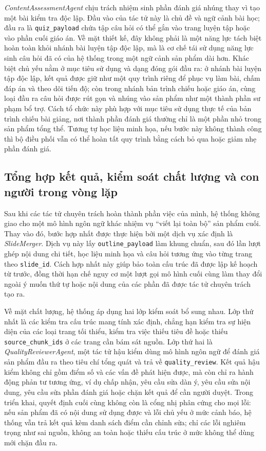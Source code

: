 \documentclass[../DoAn.tex]{subfiles}
\begin{document}
\textit{ContentAssessmentAgent} chịu trách nhiệm sinh phần đánh giá nhúng thay vì tạo một bài kiểm tra độc lập. Đầu vào của tác tử này là chủ đề và ngữ cảnh bài học; đầu ra là \texttt{quiz\_payload} chứa tập câu hỏi có thể gắn vào trang luyện tập hoặc vào phần cuối giáo án. Về mặt thiết kế, đây không phải là một năng lực tách biệt hoàn toàn khỏi nhánh bài luyện tập độc lập, mà là cơ chế tái sử dụng năng lực sinh câu hỏi đã có của hệ thống trong một ngữ cảnh sản phẩm dài hơn. Khác biệt chủ yếu nằm ở mục tiêu sử dụng và dạng đóng gói đầu ra: ở nhánh bài luyện tập độc lập, kết quả được giữ như một quy trình riêng để phục vụ làm bài, chấm đáp án và theo dõi tiến độ; còn trong nhánh bản trình chiếu hoặc giáo án, cùng loại đầu ra câu hỏi được rút gọn và nhúng vào sản phẩm như một thành phần sư phạm bổ trợ. Cách tổ chức này phù hợp với mục tiêu sử dụng thực tế của bản trình chiếu bài giảng, nơi thành phần đánh giá thường chỉ là một phần nhỏ trong sản phẩm tổng thể. Tương tự học liệu minh họa, nếu bước này không thành công thì bộ điều phối vẫn có thể hoàn tất quy trình bằng cách bỏ qua hoặc giảm nhẹ phần đánh giá.

\subsection{Tổng hợp kết quả, kiểm soát chất lượng và con người trong vòng lặp}

Sau khi các tác tử chuyên trách hoàn thành phần việc của mình, hệ thống không giao cho một mô hình ngôn ngữ khác nhiệm vụ ``viết lại toàn bộ'' sản phẩm cuối. Thay vào đó, bước hợp nhất được thực hiện bởi một dịch vụ xác định là \textit{SlideMerger}. Dịch vụ này lấy \texttt{outline\_payload} làm khung chuẩn, sau đó lần lượt ghép nội dung chi tiết, học liệu minh họa và câu hỏi tương ứng vào từng trang theo \texttt{slide\_id}. Cách hợp nhất này giúp bảo toàn cấu trúc đã được lập kế hoạch từ trước, đồng thời hạn chế nguy cơ một lượt gọi mô hình cuối cùng làm thay đổi ngoài ý muốn thứ tự hoặc nội dung của các phần đã được tác tử chuyên trách tạo ra.

Về mặt chất lượng, hệ thống áp dụng hai lớp kiểm soát bổ sung nhau. Lớp thứ nhất là các kiểm tra cấu trúc mang tính xác định, chẳng hạn kiểm tra sự hiện diện của các loại trang tối thiểu, kiểm tra việc thiếu tiêu đề hoặc thiếu \texttt{source\_chunk\_ids} ở các trang cần bám sát nguồn. Lớp thứ hai là \textit{QualityReviewerAgent}, một tác tử hậu kiểm dùng mô hình ngôn ngữ để đánh giá sản phẩm đầu ra theo tiêu chí tổng quát và trả về \texttt{quality\_review}. Kết quả hậu kiểm không chỉ gồm điểm số và các vấn đề phát hiện được, mà còn chỉ ra hành động phản tư tương ứng, ví dụ chấp nhận, yêu cầu sửa dàn ý, yêu cầu sửa nội dung, yêu cầu sửa phần đánh giá hoặc chặn kết quả để cần người duyệt. Trong triển khai, quyết định cuối cùng không còn là cổng nhị phân cứng cho mọi lỗi: nếu sản phẩm đã có nội dung sử dụng được và lỗi chủ yếu ở mức cảnh báo, hệ thống vẫn trả kết quả kèm danh sách điểm cần chỉnh sửa; chỉ các lỗi nghiêm trọng như sai nguồn, không an toàn hoặc thiếu cấu trúc ở mức không thể dùng mới chặn đầu ra.
\end{document}
